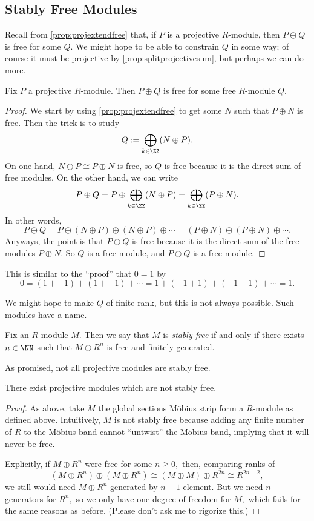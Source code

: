 \documentclass[../notes.tex]{subfiles}
\begin{document}
\subsection{Stably Free Modules}
Recall from \autoref{prop:projextendfree} that, if $P$ is a projective $R$-module, then $P\oplus Q$ is free for some $Q.$ We might hope to be able to constrain $Q$ in some way; of course it must be projective by \autoref{prop:splitprojectivesum}, but perhaps we can do more.
\begin{proposition}
	Fix $P$ a projective $R$-module. Then $P\oplus Q$ is free for some free $R$-module $Q.$
\end{proposition}
\begin{proof}
	We start by using \autoref{prop:projextendfree} to get some $N$ such that $P\oplus N$ is free. Then the trick is to study
	\[Q:=\bigoplus_{k\in\ZZ}(N\oplus P).\]
	On one hand, $N\oplus P\cong P\oplus N$ is free, so $Q$ is free because it is the direct sum of free modules. On the other hand, we can write
	\[P\oplus Q=P\oplus\bigoplus_{k\in\ZZ}(N\oplus P)=\bigoplus_{k\in\ZZ}(P\oplus N).\]
	In other words,
	\[P\oplus Q=P\oplus(N\oplus P)\oplus(N\oplus P)\oplus\cdots=(P\oplus N)\oplus(P\oplus N)\oplus\cdots.\]
	Anyways, the point is that $P\oplus Q$ is free because it is the direct sum of the free modules $P\oplus N.$ So $Q$ is a free module, and $P\oplus Q$ is a free module.
\end{proof}
\begin{remark}
	This is similar to the ``proof'' that $0=1$ by
	\[0=(1+-1)+(1+-1)+\cdots=1+(-1+1)+(-1+1)+\cdots=1.\]
\end{remark}
We might hope to make $Q$ of finite rank, but this is not always possible. Such modules have a name.
\begin{definition}
	Fix an $R$-module $M.$ Then we say that $M$ is \textit{stably free} if and only if there exists $n\in\NN$ such that $M\oplus R^n$ is free and finitely generated.
\end{definition}
As promised, not all projective modules are stably free.
\begin{proposition}
	There exist projective modules which are not stably free.
\end{proposition}
\begin{proof}
	As above, take $M$ the global sections M\"obius strip form a $R$-module as defined above. Intuitively, $M$ is not stably free because adding any finite number of $R$ to the M\"obius band cannot ``untwist'' the M\"obius band, implying that it will never be free.
	
	Explicitly, if $M\oplus R^n$ were free for some $n\ge0,$ then, comparing ranks of
	\[\left(M\oplus R^n\right)\oplus \left(M\oplus R^n\right)\cong(M\oplus M)\oplus R^{2n}\cong R^{2n+2},\]
	we still would need $M\oplus R^n$ generated by $n+1$ element. But we need $n$ generators for $R^n,$ so we only have one degree of freedom for $M,$ which fails for the same reasons as before. (Please don't ask me to rigorize this.)
\end{proof}
\end{document}
